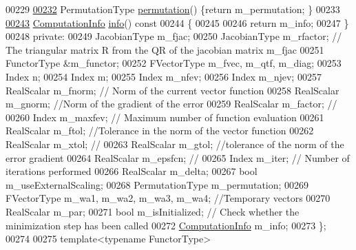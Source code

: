 \begin{DoxyCode}
00229     
\hyperlink{class_eigen_1_1_levenberg_marquardt_a691142ba877e072c58016b4be77e9855}{00232}     PermutationType \hyperlink{class_eigen_1_1_levenberg_marquardt_a691142ba877e072c58016b4be77e9855}{permutation}() \{\textcolor{keywordflow}{return} m\_permutation; \}
00233     
\hyperlink{class_eigen_1_1_levenberg_marquardt_ae65bdccd2487989ae9b25f9c2e9dfab9}{00243}     \hyperlink{group__enums_ga85fad7b87587764e5cf6b513a9e0ee5e}{ComputationInfo} \hyperlink{class_eigen_1_1_levenberg_marquardt_ae65bdccd2487989ae9b25f9c2e9dfab9}{info}()\textcolor{keyword}{ const}
00244 \textcolor{keyword}{    }\{
00245       
00246       \textcolor{keywordflow}{return} m\_info;
00247     \}
00248   \textcolor{keyword}{private}:
00249     JacobianType m\_fjac; 
00250     JacobianType m\_rfactor; \textcolor{comment}{// The triangular matrix R from the QR of the jacobian matrix m\_fjac}
00251     FunctorType &m\_functor;
00252     FVectorType m\_fvec, m\_qtf, m\_diag; 
00253     Index n;
00254     Index m; 
00255     Index m\_nfev;
00256     Index m\_njev; 
00257     RealScalar m\_fnorm; \textcolor{comment}{// Norm of the current vector function}
00258     RealScalar m\_gnorm; \textcolor{comment}{//Norm of the gradient of the error }
00259     RealScalar m\_factor; \textcolor{comment}{//}
00260     Index m\_maxfev; \textcolor{comment}{// Maximum number of function evaluation}
00261     RealScalar m\_ftol; \textcolor{comment}{//Tolerance in the norm of the vector function}
00262     RealScalar m\_xtol; \textcolor{comment}{// }
00263     RealScalar m\_gtol; \textcolor{comment}{//tolerance of the norm of the error gradient}
00264     RealScalar m\_epsfcn; \textcolor{comment}{//}
00265     Index m\_iter; \textcolor{comment}{// Number of iterations performed}
00266     RealScalar m\_delta;
00267     \textcolor{keywordtype}{bool} m\_useExternalScaling;
00268     PermutationType m\_permutation;
00269     FVectorType m\_wa1, m\_wa2, m\_wa3, m\_wa4; \textcolor{comment}{//Temporary vectors}
00270     RealScalar m\_par;
00271     \textcolor{keywordtype}{bool} m\_isInitialized; \textcolor{comment}{// Check whether the minimization step has been called}
00272     \hyperlink{group__enums_ga85fad7b87587764e5cf6b513a9e0ee5e}{ComputationInfo} m\_info; 
00273 \};
00274 
00275 \textcolor{keyword}{template}<\textcolor{keyword}{typename} FunctorType>

\end{DoxyCode}
